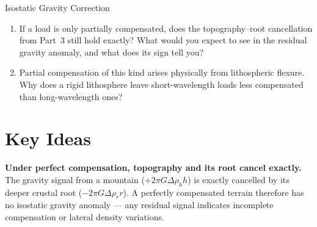 \begin{activity}{Isostatic Gravity Correction}
\begin{questions}
    \begin{enumerate}
        \item If a load is only partially compensated, does the topography--root cancellation from Part~3 still hold exactly? What would you expect to see in the residual gravity anomaly, and what does its sign tell you?
        \answerbox[3cm]

        \item Partial compensation of this kind arises physically from lithospheric flexure. Why does a rigid lithosphere leave short-wavelength loads less compensated than long-wavelength ones?
        \answerbox[3cm]
    \end{enumerate}
\end{questions}

\section*{Key Ideas}

\textbf{Under perfect compensation, topography and its root cancel exactly.} The gravity signal from a mountain ($+2\pi G \Delta \rho_h h$) is exactly cancelled by its deeper crustal root ($-2\pi G \Delta \rho_r r$). A perfectly compensated terrain therefore has no isostatic gravity anomaly --- any residual signal indicates incomplete compensation or lateral density variations.

\begin{center}
\end{center}
\end{activity}
